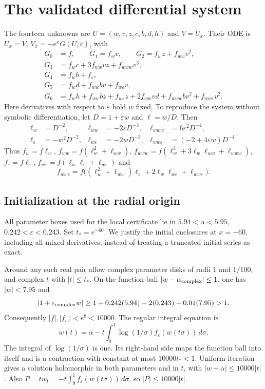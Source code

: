 \documentclass[11pt,a4paper]{report}
\begin{document}
\section{The validated differential system}
The fourteen unknowns are $U=(w,v,z,c,b,d,h)$ and $V=U_x$.
Their ODE is $U_x=V$, $V_x=-e^x G(U,\varepsilon)$, with
\begin{align*}
 G_0&=f,\qquad G_1=f_wv,\qquad G_2=f_wz+f_{ww}v^2,\\
 G_3&=f_wc+3f_{ww}vz+f_{www}v^3,\\
 G_4&=f_wb+f_\varepsilon,\\
 G_5&=f_wd+f_{ww}bv+f_{w\varepsilon}v,\\
 G_6&=f_wh+f_{ww}bz+f_{w\varepsilon}z
       +2f_{ww}vd+f_{www}bv^2+f_{ww\varepsilon}v^2.
\end{align*}
Here derivatives with respect to $\varepsilon$ hold $w$ fixed. To reproduce
the system without symbolic differentiation, let $D=1+\varepsilon w$ and
$\ell=w/D$. Then
\begin{align*}
 \ell_w&=D^{-2},& \ell_{ww}&=-2\varepsilon D^{-3},&
 \ell_{www}&=6\varepsilon^2D^{-4},\\
 \ell_\varepsilon&=-w^2D^{-2},&
 \ell_{w\varepsilon}&=-2wD^{-3},&
 \ell_{ww\varepsilon}&=(-2+4\varepsilon w)D^{-4}.
\end{align*}
Thus $f_w=f\ell_w$, $f_{ww}=f(\ell_w^2+\ell_{ww})$,
$f_{www}=f(\ell_w^3+3\ell_w\ell_{ww}+\ell_{www})$,
$f_\varepsilon=f\ell_\varepsilon$,
$f_{w\varepsilon}=f(\ell_w\ell_\varepsilon+\ell_{w\varepsilon})$ and
\[
 f_{ww\varepsilon}
 =f\bigl((\ell_w^2+\ell_{ww})\ell_\varepsilon
       +2\ell_w\ell_{w\varepsilon}+\ell_{ww\varepsilon}\bigr).
\]

\subsection{Initialization at the radial origin}
All parameter boxes used for the local certificate lie in
$5.94<\alpha<5.95$, $0.242<\varepsilon<0.243$.
Set $t_*=e^{-60}$. We justify the initial enclosures at $x=-60$,
including all mixed derivatives, instead of treating a truncated initial series
as exact.

Around any such real pair allow complex parameter disks of radii $1$ and
$1/100$, and complex $t$ with $|t|\leq t_*$. On the function ball
$|w-\alpha_{\rm complex}|\leq1$, one has $|w|<7.95$ and
\[
 |1+\varepsilon_{\rm complex}w|
 \geq 1+0.242(5.94)-2(0.243)-0.01(7.95)>1.
\]
Consequently $|f|,|f_w|<e^8<10000$. The regular integral equation is
\begin{equation}\label{eq:volterra}
 w(t)=\alpha-t\int_0^1\log(1/\sigma)
               f_\varepsilon(w(t\sigma))\,d\sigma.
\end{equation}
The integral of $\log(1/\sigma)$ is one. Its right-hand side maps the
function ball into itself and is a contraction with constant at most
$10000t_*<1$. Uniform iteration gives a solution holomorphic in both
parameters and in $t$, with $|w-\alpha|\leq10000|t|$.
Also $P=t w_t=-t\int_0^1f_\varepsilon(w(t\sigma))\,d\sigma$, so
$|P|\leq10000|t|$.
\end{document}
